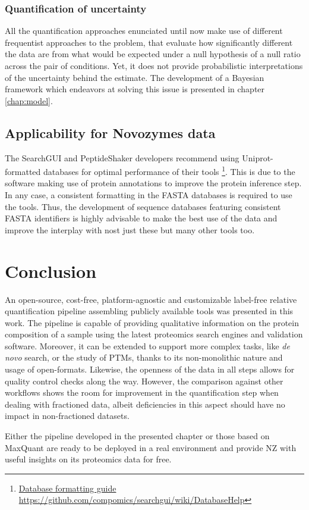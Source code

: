 \subsubsection{Quantification of uncertainty}

All the quantification approaches enunciated until now make use of different frequentist approaches to the problem, that evaluate how significantly different the data are from what would be expected under a null hypothesis of a null ratio across the pair of conditions. Yet, it does not provide probabilistic interpretations of the uncertainty behind the estimate. The development of a Bayesian framework which endeavors at solving this issue is presented in chapter \ref{chap:model}.

\subsection{Applicability for Novozymes data}

The SearchGUI and PeptideShaker developers recommend using Uniprot-formatted databases for optimal performance of their tools \footnote{\href{https://github.com/compomics/searchgui/wiki/DatabaseHelp}{Database formatting guide https://github.com/compomics/searchgui/wiki/DatabaseHelp}}. This is due to the software making use of protein annotations to improve the protein inference step. In any case, a consistent formatting in the FASTA databases is required to use the tools. Thus, the development of sequence databases featuring consistent FASTA identifiers is highly advisable to make the best use of the data and improve the interplay with nost just these but many other tools too.


\section{Conclusion}

An open-source, cost-free, platform-agnostic and customizable label-free relative quantification pipeline assembling publicly available tools was presented in this work. The pipeline is capable of providing qualitative information on the protein composition of a sample using the latest proteomics search engines and validation software. Moreover, it can be extended to support more complex tasks, like \textit{de novo} search, or the study of \ac{PTM}s, thanks to its non-monolithic nature and usage of open-formats. Likewise, the openness of the data in all steps allows for quality control checks along the way. However, the comparison against other workflows shows the room for improvement in the quantification step when dealing with fractioned data, albeit deficiencies in this aspect should have no impact in non-fractioned datasets.

Either the pipeline developed in the presented chapter or those based on MaxQuant are ready to be deployed in a real environment and provide \ac{NZ} with useful insights on its proteomics data for free.